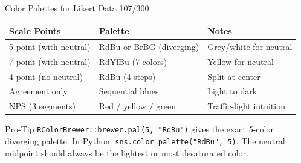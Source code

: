 \documentclass[10pt]{beamer}
\newcommand{\smark}[1]{\hfill{\scriptsize\color{codegray}#1}}
\begin{document}
\begin{frame}{Color Palettes for Likert Data}
\smark{107/300}
\centering\small
\begin{tabular}{@{}lll@{}}
    \toprule
    \textbf{Scale Points} & \textbf{Palette} & \textbf{Notes} \\
    \midrule
    5-point (with neutral)  & RdBu or BrBG (diverging) & Grey/white for neutral \\
    7-point (with neutral)  & RdYlBu (7 colors)         & Yellow for neutral \\
    4-point (no neutral)    & RdBu (4 steps)             & Split at center \\
    Agreement only          & Sequential blues            & Light to dark \\
    NPS (3 segments)        & Red / yellow / green        & Traffic-light intuition \\
    \bottomrule
\end{tabular}

\vspace{0.3cm}
\begin{alertblock}{Pro-Tip}
    \scriptsize \texttt{RColorBrewer::brewer.pal(5, "RdBu")} gives the exact 5-color diverging palette. In Python: \texttt{sns.color\_palette("RdBu", 5)}. The neutral midpoint should always be the lightest or most desaturated color.
\end{alertblock}
\end{frame}
\end{document}
